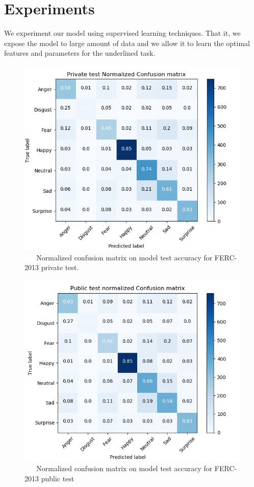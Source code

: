 \documentclass[master]{thesis-uestc}
\begin{document}
\section{Experiments}
We experiment our model using supervised learning techniques. That it, we expose the model to large amount of data and we allow it to learn the optimal features and parameters for the underlined task.

\begin{figure}[ht]
\includegraphics[width=5in]{pic/FER-2013_private_test_CM_normalzed.png}
\caption{\,\,\,\,\,\,\,\,\,\,Normalized confusion matrix on model test accuracy for FERC-2013 private test.}
\label{fig_ferpr_cm_scores}
\end{figure}

\begin{figure}[ht]
\includegraphics[width=5in]{pic/FER-2013_public_test_CM_normalzed.png}
\caption{\,\,\,\,\,\,\,\,\,\,Normalized confusion matrix on model test accuracy for FERC-2013 public test}
\label{fig_ferpub_cm_scores}
\end{figure}
\end{document}
